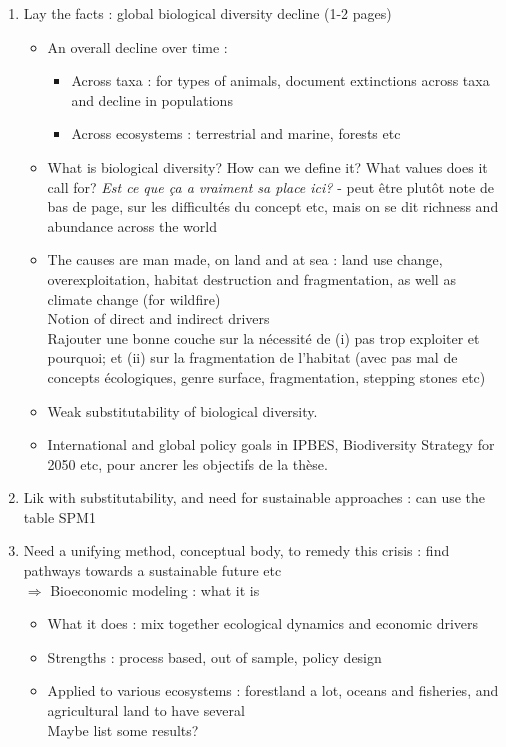 \begin{enumerate}
\item Lay the facts : global biological diversity decline (1-2 pages)
\begin{itemize}

\item An overall decline over time : 
\begin{itemize}
\item Across taxa : for types of animals, document extinctions across taxa and decline in populations
\item Across ecosystems : terrestrial and marine, forests etc
\end{itemize}

\item What is biological diversity? How can we define it? What values does it call for? \textit{Est ce que ça a vraiment sa place ici?} - peut être plutôt note de bas de page, sur les difficultés du concept etc, mais on se dit richness and abundance across the world

\item The causes are man made, on land and at sea : land use change, overexploitation, habitat destruction and fragmentation, as well as climate change (for wildfire)
\\
Notion of direct and indirect drivers\\

Rajouter une bonne couche sur la nécessité de (i) pas trop exploiter et pourquoi; et (ii) sur la fragmentation de l'habitat (avec pas mal de concepts écologiques, genre surface, fragmentation, stepping stones etc)
\item Weak substitutability of biological diversity.\\
\item International and global policy goals in IPBES, Biodiversity Strategy for 2050 etc, pour ancrer les objectifs de la thèse.
\end{itemize}

\item Lik with substitutability, and need for sustainable approaches : can use the table SPM1

\item Need a unifying method, conceptual body, to remedy this crisis : find pathways towards a sustainable future etc\\
$\Rightarrow$ Bioeconomic modeling : what it is

\begin{itemize}
\item What it does : mix together ecological dynamics and economic drivers
\item Strengths : process based, out of sample, policy design
\item Applied to various ecosystems : forestland a lot, oceans and fisheries, and agricultural land to have several \\
Maybe list some results?
\end{itemize}


\end{enumerate}
